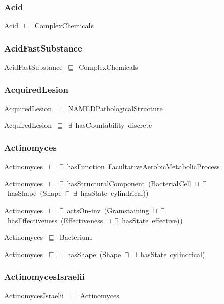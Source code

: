 \documentclass{article}
\begin{document}
\subsubsection*{Acid}

Acid~\ensuremath{\sqsubseteq}~ComplexChemicals~

\subsubsection*{AcidFastSubstance}

AcidFastSubstance~\ensuremath{\sqsubseteq}~ComplexChemicals~

\subsubsection*{AcquiredLesion}

AcquiredLesion~\ensuremath{\sqsubseteq}~NAMEDPathologicalStructure~

AcquiredLesion~\ensuremath{\sqsubseteq}~\ensuremath{\exists}~hasCountability~discrete~

\subsubsection*{Actinomyces}

Actinomyces~\ensuremath{\sqsubseteq}~\ensuremath{\exists}~hasFunction~FacultativeAerobicMetabolicProcess~

Actinomyces~\ensuremath{\sqsubseteq}~\ensuremath{\exists}~hasStructuralComponent~(BacterialCell~\ensuremath{\sqcap}~\ensuremath{\exists}~hasShape~(Shape~\ensuremath{\sqcap}~\ensuremath{\exists}~hasState~cylindrical))~

Actinomyces~\ensuremath{\sqsubseteq}~\ensuremath{\exists}~actsOn-inv~(Gramstaining~\ensuremath{\sqcap}~\ensuremath{\exists}~hasEffectiveness~(Effectiveness~\ensuremath{\sqcap}~\ensuremath{\exists}~hasState~effective))~

Actinomyces~\ensuremath{\sqsubseteq}~Bacterium~

Actinomyces~\ensuremath{\sqsubseteq}~\ensuremath{\exists}~hasShape~(Shape~\ensuremath{\sqcap}~\ensuremath{\exists}~hasState~cylindrical)~

\subsubsection*{ActinomycesIsraelii}

ActinomycesIsraelii~\ensuremath{\sqsubseteq}~Actinomyces~
\end{document}
